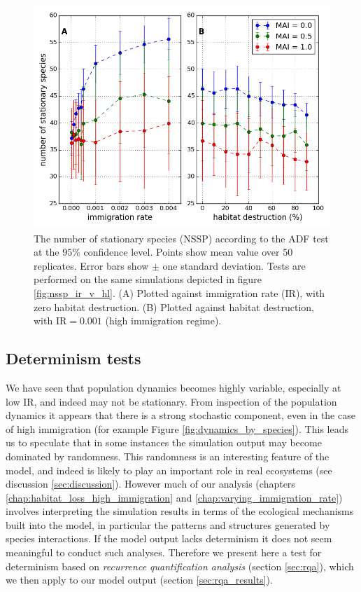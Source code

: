 \begin{figure}[h!]
	\centering
	\includegraphics[width=0.8\linewidth]{"./chapters/chapter04b/figures/nssp_v_ir_and_hl"}
    \caption{The number of stationary species (NSSP) according to the ADF test at the $95\%$ confidence level. Points show mean value over 50 replicates. Error bars show $\pm$ one standard deviation. Tests are performed on the same simulations depicted in figure \ref{fig:nssp_ir_v_hl}. (A) Plotted against immigration rate (IR), with zero habitat destruction. (B) Plotted against habitat destruction, with IR$=0.001$ (high immigration regime). }    
    \label{fig:nssp_v_ir_and_hl}
\end{figure}


\clearpage
\subsection{Determinism tests}
\label{sec:determinism}

We have seen that population dynamics becomes highly variable, especially at low IR, and indeed may not be stationary. From inspection of the population dynamics it appears that there is a strong stochastic component, even in the case of high immigration (for example Figure \ref{fig:dynamics_by_species}). This leads us to speculate that in some instances the simulation output may become dominated by randomness. This randomness is an interesting feature of the model, and indeed is likely to play an important role in real ecosystems (see discussion \ref{sec:discussion}). However much of our analysis (chapters \ref{chap:habitat_loss_high_immigration} and \ref{chap:varying_immigration_rate}) involves interpreting the simulation results in terms of the ecological mechanisms built into the model, in particular the patterns and structures generated by species interactions. If the model output lacks determinism it does not seem meaningful to conduct such analyses. Therefore we present here a test for determinism based on \emph{recurrence quantification analysis} (section \ref{sec:rqa}), which we then apply to our model output (section \ref{sec:rqa_results}).

